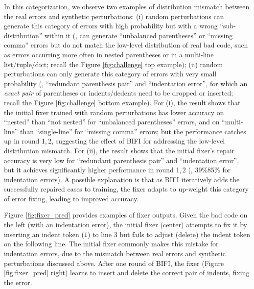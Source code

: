In this categorization, we observe two examples of distribution mismatch between the real errors and synthetic perturbations: (i) random perturbations can generate this category of errors with high probability but with a wrong ``sub-distribution'' within it (\eg, can generate ``unbalanced parentheses'' or ``missing comma'' errors but do not match the low-level distribution of real bad code, such as errors occurring more often in nested parentheses or in a multi-line list/tuple/dict; recall the Figure \ref{fig:challenge} top example); 
(ii) random perturbations can only generate this category of errors with very small probability (\eg, ``redundant parenthesis pair'' and ``indentation error'', for which an \textit{exact pair} of parentheses or indents/dedents need to be dropped or inserted; recall the Figure \ref{fig:challenge} bottom example).
For (i), the result shows that the initial fixer trained with random perturbations has lower accuracy on ``nested'' than ``not nested'' for ``unbalanced parentheses'' errors, and on ``multi-line'' than ``single-line'' for ``missing comma'' errors; but the performance catches up in round 1,\,2, suggesting the effect of BIFI for addressing the low-level distribution mismatch.
For (ii), the result shows that the initial fixer's repair accuracy is very low for ``redundant parenthesis pair'' and ``indentation error'', but it achieves significantly higher performance in round 1,\,2 (\eg, 39\%85\% for indentation errors). A possible explanation is that as BIFI iteratively adds the successfully repaired cases to training, the fixer adapts to up-weight this category of error fixing, leading to improved accuracy.

 
Figure \ref{fig:fixer_pred} provides examples of fixer outputs. Given the bad code on the left (with an indentation error), the initial fixer (center) attempts to fix it by inserting an indent token (\texttt{I}) to line 3 but fails to adjust (delete) the indent token on the following line. The initial fixer commonly makes this mistake for indentation errors, due to the mismatch between real errors and synthetic perturbations discussed above. After one round of BIFI, the fixer (Figure \ref{fig:fixer_pred} right) learns to insert and delete the correct pair of indents, fixing the error.
